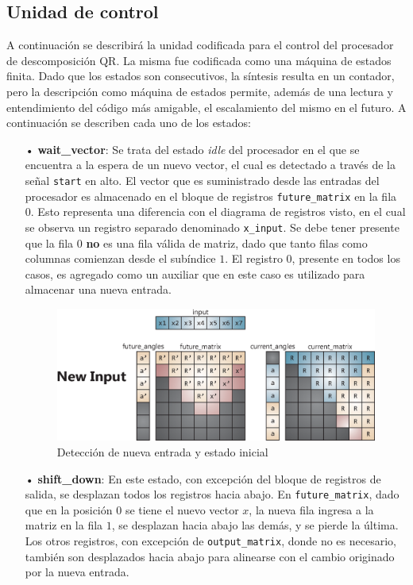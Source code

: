 \subsection{Unidad de control}

A continuación se describirá la unidad codificada para el control del procesador de descomposición QR. La misma fue codificada como una máquina de estados finita. Dado que los estados son consecutivos, la síntesis resulta en un contador, pero la descripción como máquina de estados permite, además de una lectura y entendimiento del código más amigable, el escalamiento del mismo en el futuro. A continuación se describen cada uno de los estados:

\begin{itemize}
	\item[•] \textbf{wait\_vector}: Se trata del estado \textit{idle} del procesador en el que se encuentra a la espera de un nuevo vector, el cual es detectado a través de la señal \verb;start; en alto. El vector que es suministrado desde las entradas del procesador es almacenado en el bloque de registros \verb;future_matrix; en la fila 0. Esto representa una diferencia con el diagrama de registros visto, en el cual se observa un registro separado denominado \verb;x_input;. Se debe tener presente que la fila 0 \textbf{no} es una fila válida de matriz, dado que tanto filas como columnas comienzan desde el subíndice $1$. El registro 0, presente en todos los casos, es agregado como un auxiliar que en este caso es utilizado para almacenar una nueva entrada.
		
	\begin{figure}[h!]
	 	\begin{center}
	 		\includegraphics[width=12 cm]{./figures/C04-algorithm_new_input}
	 		\caption{Detección de nueva entrada y estado inicial}
			\label{fig:algorithm_new_input}
	 	\end{center}
	\end{figure}
	
	\item[•] \textbf{shift\_down}: En este estado, con excepción del bloque de registros de salida, se desplazan todos los registros hacia abajo. En \verb;future_matrix;, dado que en la posición $0$ se tiene el nuevo vector $x$, la nueva fila ingresa a la matriz en la fila $1$, se desplazan hacia abajo las demás, y se pierde la última. Los otros registros, con excepción de \verb;output_matrix;, donde no es necesario, también son desplazados hacia abajo para alinearse con el cambio originado por la nueva entrada.
	

\end{itemize}
